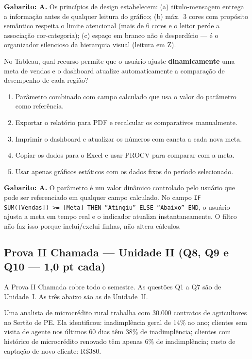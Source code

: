 \textbf{Gabarito: A.} Os princípios de design estabelecem: (a) título-mensagem entrega a informação antes de qualquer leitura do gráfico; (b) máx.\ 3 cores com propósito semântico respeita o limite atencional (mais de 6 cores e o leitor perde a associação cor-categoria); (c) espaço em branco não é desperdício --- é o organizador silencioso da hierarquia visual (leitura em Z).

\begin{SolvedBox}[title=Questão 10 (Prova Final) --- Tableau: Filtros e Parâmetros (1{,}0 pt)]
No Tableau, qual recurso permite que o usuário ajuste \textbf{dinamicamente} uma meta de vendas e o dashboard atualize automaticamente a comparação de desempenho de cada região?
\begin{enumerate}[label=\Alph*)]
  \item Parâmetro combinado com campo calculado que usa o valor do parâmetro como referência.
  \item Exportar o relatório para PDF e recalcular os comparativos manualmente.
  \item Imprimir o dashboard e atualizar os números com caneta a cada nova meta.
  \item Copiar os dados para o Excel e usar PROCV para comparar com a meta.
  \item Usar apenas gráficos estáticos com os dados fixos do período selecionado.
\end{enumerate}
\end{SolvedBox}

\textbf{Gabarito: A.} O parâmetro é um valor dinâmico controlado pelo usuário que pode ser referenciado em qualquer campo calculado. No campo \texttt{IF SUM([Vendas]) >= [Meta] THEN ``Atingiu'' ELSE ``Abaixo'' END}, o usuário ajusta a meta em tempo real e o indicador atualiza instantaneamente. O filtro não faz isso porque inclui/exclui linhas, não altera cálculos.

\subsection*{Prova II Chamada --- Unidade II (Q8, Q9 e Q10 --- 1,0 pt cada)}

A Prova II Chamada cobre todo o semestre. As questões Q1 a Q7 são de Unidade~I. As três abaixo são as de Unidade~II.

Uma analista de microcrédito rural trabalha com 30.000 contratos de agricultores no Sertão de PE. Ela identificou: inadimplência geral de 14\% ao ano; clientes sem visita de agente nos últimos 60 dias têm 38\% de inadimplência; clientes com histórico de microcrédito renovado têm apenas 6\% de inadimplência; custo de captação de novo cliente: R\$380.

